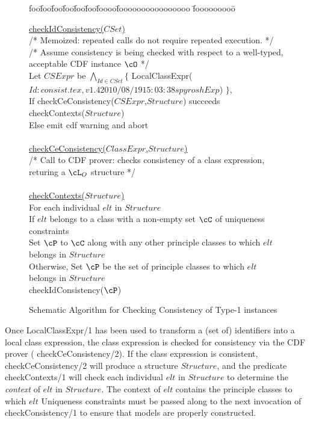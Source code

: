 \begin{figure}[htbp]
\longline
{\sf
\begin{tabbing}
foo\=foo\=foo\=foo\=foo\=foo\=foooo\=foooooooooooooooo \=fooooooooo\=\kill

\> \underline{checkIdConsistency($CSet$)}  \\
\> \> 	{\rm /* Memoized: repeated calls do
		not require repeated execution.  */ }\\
\> \> 	{\rm /* Assume consistency is being checked with respect to a
		well-typed, acceptable CDF instance $\cO$ */} \\
\> \> 	Let $CSExpr$ be $\bigwedge_{Id \in CSet} \{$ 
			LocalClassExpr($Id: consist.tex,v 1.4 2010/08/19 15:03:38 spyrosh Exp $) $\}$,  \\
\> \> 	If checkCeConsistency($CSExpr$,$Structure$) succeeds  \\
\> \> \> 	    checkContexts($Structure$) \\
\> \>     Else emit cdf warning and abort \\
\\
\> \underline{checkCeConsistency($ClassExpr$,$Structure$)} \\
\> \> {\rm /*  Call to CDF prover: checks consistency of a class
	         expression, returing a $\cL_O$ structure */} \\
\\
\> \underline{checkContexts($Structure$)}  \\
\> \> For each individual $elt$ in $Structure$ \\
\> \> \> If $elt$ belongs to a class with a non-empty set $\cC$ of
			uniqueness constraints \\
\> \> \> \> Set $\cP$ to $\cC$ along with any other principle classes to
		which  $elt$ belongs in $Structure$ \\ 
\> \> \> Otherwise, Set $\cP$ be the set of 
		principle classes to which $elt$ belongs in $Structure$ \\ 
\> \> \> checkIdConsistency($\cP$) \\
\end{tabbing}
}
\caption{Schematic Algorithm for Checking Consistency of Type-1 instances}
\label{fig:type1cc}
\longline
\end{figure}

Once {\sf LocalClassExpr/1} has been used to transform a (set of)
identifiers into a local class expression, the class expression is
checked for consistency via the CDF prover ({\sf
checkCeConsistency/2}).  If the class expression is consistent, {\sf
checkCeConsistency/2} will produce a structure $Structure$, and the
predicate {\sf checkContexts/1} will check each individual $elt$ in
$Structure$ to determine the {\em context} of $elt$ in $Structure$.
The context of $elt$ contains the principle classes to which $elt$
Uniqueness constraints must be passed along to the next invocation of
{\sf checkConsistency/1} to ensure that models are properly
constructed.

